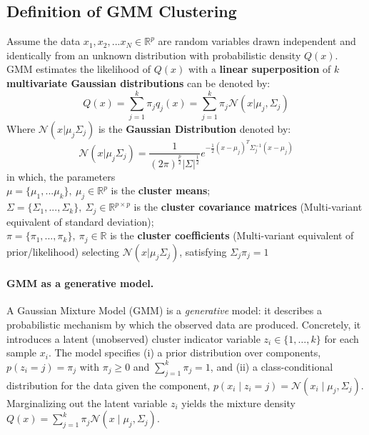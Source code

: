\documentclass{article}
\begin{document}
\subsection{Definition of GMM Clustering}
Assume the data $x_1,x_2,...x_N \in \mathbb{R}^{p}$ are random variables drawn independent and identically from an unknown distribution with probabilistic density $Q(x)$. GMM estimates the likelihood of $Q(x)$ with a \textbf{linear superposition} of $k$ \textbf{multivariate Gaussian distributions} can be denoted by:\[
Q(x) = \sum_{j=1}^{k}\pi_{j}q_{j}(x)=\sum_{j=1}^{k}\pi_{j}\mathcal{N}   (x|\mu_{j},\Sigma_{j})
\]
Where $\mathcal{N}(x|\mu_{j}\Sigma_{j})$ is the \textbf{Gaussian Distribution} denoted by:\[
\mathcal{N}(x|\mu_{j}\Sigma_{j})=\frac{1}{(2\pi)^{\frac{p}{2}}|\Sigma|^{\frac{1}{2}}}e^{-\frac{1}{2}(x-\mu_{j})^{T}\Sigma_{j}^{-1}(x-\mu_{j})}
\]
in which, the parameters\\
$\mu = \{\mu_1,...\mu_k\}, \: \mu_{j} \in \mathbb{R}^{p}$ is the \textbf{cluster means};\\
$\Sigma = \{\Sigma_1,...,\Sigma_k\}, \: \Sigma_{j} \in \mathbb{R}^{p\times p}$ is the \textbf{cluster covariance matrices} (Multi-variant equivalent of standard deviation);\\
$\pi = \{\pi_1,...,\pi_k\}, \: \pi_{j}\in \mathbb{R}$ is the \textbf{cluster coefficients} (Multi-variant equivalent of prior/likelihood) selecting $\mathcal{N}(x|\mu_{j}\Sigma_{j})$, satisfying $\Sigma_{j}\pi_{j} = 1$\\

\paragraph{GMM as a generative model.}
A Gaussian Mixture Model (GMM) is a \emph{generative} model: it describes a probabilistic mechanism by which the observed data are produced. Concretely, it introduces a latent (unobserved) cluster indicator variable $z_i \in \{1,\dots,k\}$ for each sample $x_i$. The model specifies (i) a prior distribution over components, $p(z_i=j)=\pi_j$ with $\pi_j \ge 0$ and $\sum_{j=1}^k \pi_j = 1$, and (ii) a class-conditional distribution for the data given the component, $p(x_i \mid z_i=j)=\mathcal{N}(x_i \mid \mu_j, \Sigma_j)$. Marginalizing out the latent variable $z_i$ yields the mixture density $Q(x)=\sum_{j=1}^k \pi_j \mathcal{N}(x \mid \mu_j, \Sigma_j)$.
\end{document}
